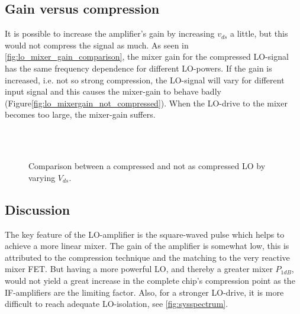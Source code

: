	\subsection{Gain versus compression}
		It is possible to increase the amplifier's gain by increasing $v_{ds}$ a little, but this would not compress the signal as much. As seen in \autoref{fig:lo_mixer_gain_comparison}, the mixer gain for the compressed LO-signal has the same frequency dependence for different LO-powers. If the gain is increased, i.e. not so strong compression, the LO-signal will vary for different input signal and this causes the mixer-gain to behave badly  (Figure\autoref{fig:lo_mixergain_not_compressed}). When the LO-drive to the mixer becomes too large, the mixer-gain suffers.


				\begin{figure}[hpt!]
					\centering
					 \\
					 \\
					\caption{Comparison between a compressed and not as compressed LO by varying $V_{ds}$.}\label{fig:lo_mixer_gain_comparison}
				\end{figure}




	\subsection{Discussion}
		The key feature of the LO-amplifier is the square-waved pulse which helps to achieve a more linear mixer. The gain of the amplifier is somewhat low, this is attributed to the compression technique and the matching to the very reactive mixer FET. But having a more powerful LO, and thereby a greater mixer $P_{1dB}$, would not yield a great increase in the complete chip's compression point as the IF-amplifiers are the limiting factor. Also, for a stronger LO-drive, it is more difficult to reach adequate LO-isolation, see \autoref{fig:sysspectrum}.

